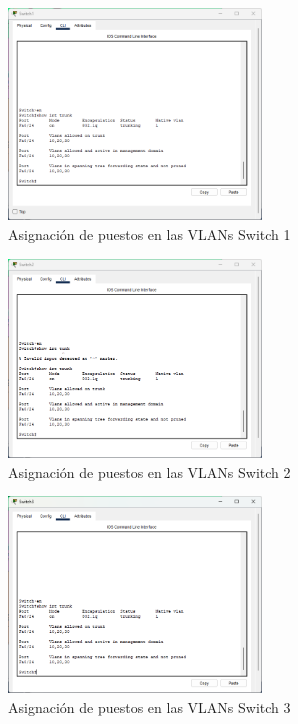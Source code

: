     \begin{figure}[H]
        \centering
        \includegraphics[width=0.6\textwidth]{img/tunksw1.png}
        \caption{Asignación de puestos en las VLANs Switch 1}
        \label{fig:swtru1}
    \end{figure}
    \begin{figure}[H]
        \centering
        \includegraphics[width=0.6\textwidth]{img/trunksw2.png}
        \caption{Asignación de puestos en las VLANs Switch 2}
        \label{fig:swtru2}
    \end{figure}
    \begin{figure}[H]
        \centering
        \includegraphics[width=0.6\textwidth]{img/trunk sw3.png}
        \caption{Asignación de puestos en las VLANs Switch 3}
        \label{fig:swtru3}
    \end{figure}
